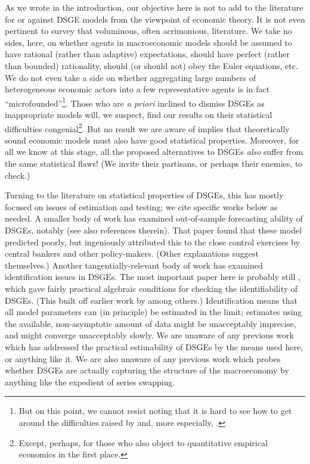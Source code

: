 \documentclass[11pt]{article}
\begin{document}
As we wrote in the introduction, our objective here is not to add to the
literature for or against DSGE models from the viewpoint of economic
theory. It is not even pertinent to survey that voluminous, often
acrimonious, literature. We take no sides, here, on whether agents in
macroeconomic models should be assumed to have rational (rather than
adaptive) expectations, should have perfect (rather than bounded)
rationality, should (or should not) obey the Euler equations, etc. We do
not even take a side on whether aggregating large numbers of
heterogeneous economic actors into a few representative agents is in
fact ``microfounded''\footnote{But on this point, we cannot resist
  noting that it is hard to see how to get around the difficulties
  raised by \citet{Kirman-contra-representative-agent} and, more
  especially,
  \citet{Jackson-Yariv-non-existence-of-representative-agents}.}. Those
who are \emph{a priori} inclined to dismiss DSGEs as inappropriate
models will, we suspect, find our results on their statistical
difficulties congenial\footnote{Except, perhaps, for those who also
  object to quantitative empirical economics in the first place.}. But
no result we are aware of implies that theoretically sound economic
models must also have good statistical properties. Moreover, for all we
know at this stage, all the proposed alternatives to DSGEs \emph{also}
suffer from the same statistical flaws! (We invite their partisans, or
perhaps their enemies, to check.)

Turning to the literature on statistical properties of DSGEs, this has
mostly focused on issues of estimation and testing; we cite specific
works below as needed. A smaller body of work has examined out-of-sample
forecasting ability of DSGEs, notably \citet{Edge-Gurkaynak-on-dsges}
(see also references therein). That paper found that these model
predicted poorly, but ingeniously attributed this to the close control
exercises by central bankers and other policy-makers. (Other
explanations suggest themselves.) Another tangentially-relevant body of
work has examined identification issues in DSGEs. The most important
paper here is probably still
\citet{Komunjer-Ng-identification-of-DSGEs}, which gave fairly practical
algebraic conditions for checking the identifiability of DSGEs. (This
built off earlier work by \citealt{Iskrev2009} among others.)
Identification means that all model parameters can (in principle) be
estimated in the limit; estimates using the available, non-asymptotic
amount of data might be unacceptably imprecise, and might converge
unacceptably slowly. We are unaware of any previous work which has
addressed the practical estimability of DSGEs by the means used here, or
anything like it. We are also unaware of any previous work which probes
whether DSGEs are actually capturing the structure of the macroeconomy
by anything like the expedient of series swapping.
\end{document}
